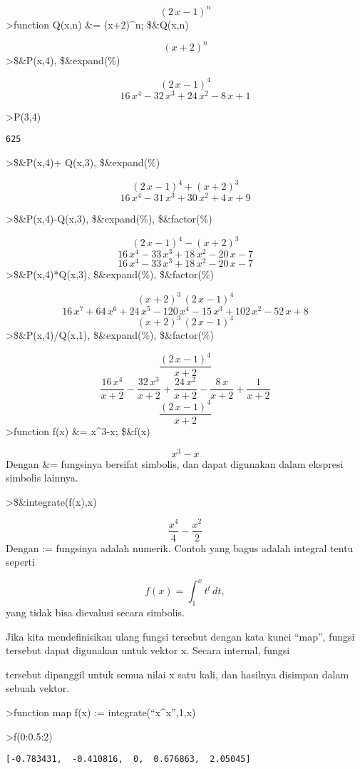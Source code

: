 \documentclass[
]{book}
\begin{document}
\[\left(2\,x-1\right)^{n}\]\textgreater function Q(x,n) \&= (x+2)\^{}n; \$\&Q(x,n)

\[\left(x+2\right)^{n}\]\textgreater\$\&P(x,4), \$\&expand(\%)

\[\left(2\,x-1\right)^4\] \[16\,x^4-32\,x^3+24\,x^2-8\,x+1\]

\textgreater P(3,4)

\begin{verbatim}
625
\end{verbatim}

\textgreater\$\&P(x,4)+ Q(x,3), \$\&expand(\%)

\[\left(2\,x-1\right)^4+\left(x+2\right)^3\] \[16\,x^4-31\,x^3+30\,x^2+4\,x+9\]

\textgreater\$\&P(x,4)-Q(x,3), \$\&expand(\%), \$\&factor(\%)

\[\left(2\,x-1\right)^4-\left(x+2\right)^3\] \[16\,x^4-33\,x^3+18\,x^2-20\,x-7\] \[16\,x^4-33\,x^3+18\,x^2-20\,x-7\]\textgreater\$\&P(x,4)*Q(x,3), \$\&expand(\%), \$\&factor(\%)

\[\left(x+2\right)^3\,\left(2\,x-1\right)^4\] \[16\,x^7+64\,x^6+24\,x^5-120\,x^4-15\,x^3+102\,x^2-52\,x+8\] \[\left(x+2\right)^3\,\left(2\,x-1\right)^4\]\textgreater\$\&P(x,4)/Q(x,1), \$\&expand(\%), \$\&factor(\%)

\[\frac{\left(2\,x-1\right)^4}{x+2}\] \[\frac{16\,x^4}{x+2}-\frac{32\,x^3}{x+2}+\frac{24\,x^2}{x+2}-\frac{8 \,x}{x+2}+\frac{1}{x+2}\] \[\frac{\left(2\,x-1\right)^4}{x+2}\]\textgreater function f(x) \&= x\^{}3-x; \$\&f(x)

\[x^3-x\]Dengan \&= fungsinya bersifat simbolis, dan dapat digunakan dalam ekspresi simbolis lainnya.

\textgreater\$\&integrate(f(x),x)

\[\frac{x^4}{4}-\frac{x^2}{2}\]Dengan := fungsinya adalah numerik. Contoh yang bagus adalah integral tentu seperti

\[f(x) = \int_1^x t^t \, dt,\]yang tidak bisa dievalusi secara simbolis.

Jika kita mendefinisikan ulang fungsi tersebut dengan kata kunci ``map'', fungsi tersebut dapat digunakan untuk vektor x. Secara internal, fungsi

tersebut dipanggil untuk semua nilai x satu kali, dan hasilnya disimpan dalam sebuah vektor.

\textgreater function map f(x) := integrate(``x\^{}x'',1,x)

\textgreater f(0:0.5:2)

\begin{verbatim}
[-0.783431,  -0.410816,  0,  0.676863,  2.05045]
\end{verbatim}
\end{document}
